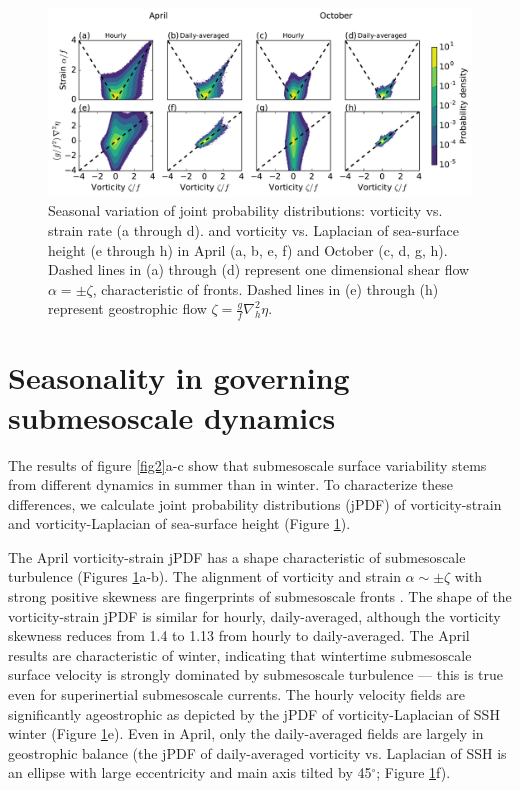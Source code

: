 \documentclass[grl]{agutex2015}
\begin{document}
\begin{article}
\begin{figure}[ht]
  \begin{center}
    \includegraphics[width=.95\textwidth]{figs/fig3.pdf}
 \caption{Seasonal variation of joint probability distributions:  vorticity vs. strain rate (a through d).
          and vorticity vs. Laplacian of sea-surface height (e through h) in April (a, b,
          e, f) and October (c, d, g, h).
          Dashed lines in (a) through (d) represent one dimensional shear flow $\alpha = \pm\zeta$,
          characteristic of fronts. Dashed lines in (e) through
          (h) represent geostrophic flow $\zeta = \frac{g}{f}\nabla_h^2 \eta$.}
 \label{fig3}
 \end{center}
\end{figure}

\section{Seasonality in governing submesoscale dynamics}
The results of figure \ref{fig2}a-c show that submesoscale surface
 variability stems from different dynamics in summer than in winter.
 To characterize these differences, we calculate
joint probability distributions (jPDF) of
vorticity-strain and vorticity-Laplacian of sea-surface height (Figure \ref{fig3}).

The April vorticity-strain jPDF has a shape characteristic of submesoscale turbulence
 (Figures \ref{fig3}a-b). The alignment of vorticity and strain $\alpha \sim \pm\zeta$
 with strong positive skewness are fingerprints of submesoscale fronts
 \citep{shcherbina_etal2013,mcwilliams2016}. The shape of the vorticity-strain
 jPDF is similar for hourly, daily-averaged, although
 the vorticity skewness reduces from 1.4 to 1.13 from hourly to daily-averaged.
 The April results are characteristic of winter, indicating that wintertime submesoscale
 surface velocity is strongly dominated by submesoscale turbulence --- this is true even for
 superinertial submesoscale currents. The hourly velocity fields are significantly
ageostrophic as depicted by the jPDF of vorticity-Laplacian of SSH
winter (Figure \ref{fig3}e). Even in April, only the daily-averaged fields
are largely
in  geostrophic balance (the jPDF of daily-averaged vorticity vs. Laplacian of SSH
is an ellipse with large eccentricity and main axis tilted by 45$^\circ$; Figure \ref{fig3}f).


\end{article}
\end{document}
